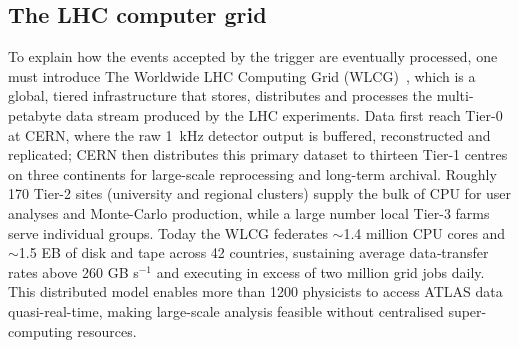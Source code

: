 \subsection{The LHC computer grid}
\label{sec:computer_grid}
To explain how the events accepted by the trigger are eventually processed, one must introduce The Worldwide LHC Computing Grid (WLCG)~\cite{Bird:1695401}, which is a global, tiered infrastructure that stores, distributes and processes the multi-petabyte data stream produced by the LHC experiments.  Data first reach Tier-0 at CERN, where the raw 1~kHz detector output is buffered, reconstructed and replicated; CERN then distributes this primary dataset to thirteen Tier-1 centres on three continents for large-scale reprocessing and long-term archival. Roughly 170 Tier-2 sites (university and regional clusters) supply the bulk of CPU for user analyses and Monte-Carlo production, while a large number local Tier-3 farms serve individual groups.  
Today the WLCG federates $\sim$1.4 million CPU cores and $\sim$1.5 EB of disk and tape across 42 countries, sustaining average data‐transfer rates above 260 GB s$^{-1}$ and executing in excess of two million grid jobs daily.  This distributed model enables more than 1200 physicists to access ATLAS data quasi-real-time, making large-scale analysis feasible without centralised super-computing resources.
